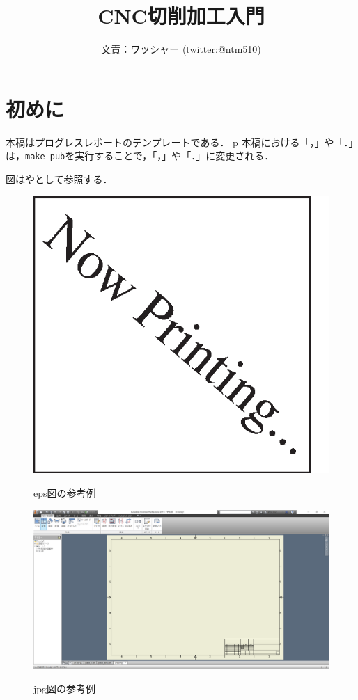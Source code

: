 \documentclass[b5paper, 9pt, twocolumn, titlepage]{jsbook}
\title{CNC切削加工入門}
\author{文責：ワッシャー (twitter:@ntm510)}
\begin{document}
\pagestyle{empty}
\maketitle
\thispagestyle{empty}
\sloppy

\section*{初めに}

本稿はプログレスレポートのテンプレートである\cite{Sakai}．
p
本稿における「，」や「．」は，\verb|make pub|を実行することで，「，」や「．」に変更される．

図はやとして参照する．

\begin{figure}[tbh]
 \begin{center}
  \begin{minipage}{0.3\columnwidth}
   \includegraphics[width=\columnwidth]{nowprinting.eps}
   \caption{eps図の参考例}
  \end{minipage}
  \hspace{0.15\columnwidth}
  \begin{minipage}{0.3\columnwidth}
   \includegraphics[width=\columnwidth]{plane.png}
   \caption{jpg図の参考例}
  \end{minipage}
  \label{figure:nowprinting}
 \end{center}
\end{figure}
\end{document}
